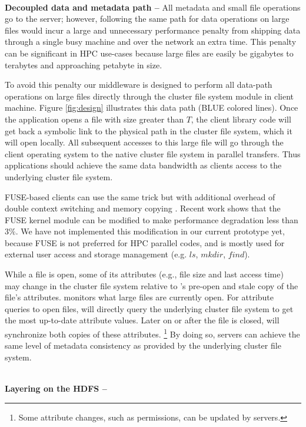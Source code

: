 ~\\
\textbf{Decoupled data and metadata path -- }
All metadata and small file operations go to the \giga server;
however, following the same path for data operations on large files
would incur a large and unnecessary performance penalty
from shipping data through a single busy machine and
over the network an extra time.
This penalty can be significant in HPC use-cases
because large files are easily be gigabytes to terabytes
and approaching petabyte in size.

To avoid this penalty our middleware is designed to perform all
data-path operations on large files directly
through the cluster file system module in client machine.
Figure \ref{fig:design} illustrates this data path (BLUE colored lines).
Once the application opens a file with size greater than $T$,
the \sys client library code will get back a symbolic link to the physical
path in the cluster file system, which it will open locally.
All subsequent accesses to this large file will go through
the client operating system to the native cluster file system
in parallel transfers.
Thus applications should achieve the same data bandwidth as
clients access to the underlying cluster file system.

FUSE-based clients can use the same trick but with additional overhead
of double context switching and memory copying \cite{PLFS}.
Recent work \cite{fuseopt} shows that the FUSE kernel module can be modified
to make performance degradation less than $3\%$. We have not implemented
this modification in our current prototype yet, because FUSE is not preferred
for HPC parallel codes, and is mostly used for external user access
and storage management (e.g. $ls$, $mkdir$, $find$).

While a file is open, some of its attributes (e.g., file size and last access time)
may change in the cluster file system relative to
\tfs's pre-open and stale copy of the file's attributes.
\sys monitors what large files are currently open.
For attribute queries to open files, \sys will directly query the underlying
cluster file system to get the most up-to-date attribute values.
Later on or after the file is closed,
\sys will synchronize both copies of these attributes.
\footnote{Some attribute changes, such as permissions, can be updated by \sys servers.}
By doing so, \sys servers can achieve the same level of metadata consistency
as provided by the underlying cluster file system.

~\\
\textbf{Layering on the HDFS -- }

